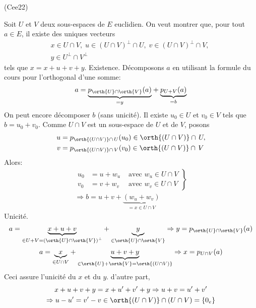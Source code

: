 \begin{tiny}(Cee22)\end{tiny} Soit $U$ et $V$ deux sous-espaces de $E$ euclidien. On veut montrer que, pour tout $a\in E$, il existe des uniques vecteurs
\begin{multline*}
  x\in U\cap V,\; u\in \left( U\cap V\right)^{\perp}\cap U,\; 
v\in \left( U\cap V\right)^{\perp}\cap V,\; \\
y\in U^{\perp}\cap V^{\perp}
\end{multline*}
tels que $x=x+u+v+y$.\newline
Existence. Décomposons $a$ en utilisant la formule du cours pour l'orthogonal d'une somme:
\begin{displaymath}
  a = \underset{=y}{\underbrace{p_{\orth{U}\cap \orth{V}}(a)}} 
  + \underset{=b}{\underbrace{p_{U+V}(a)}}
\end{displaymath}
On peut encore décomposer $b$ (sans unicité). Il existe $u_0\in U$ et $v_0\in V$ tels que $b=u_0 + v_0$.\newline
Comme $U\cap V$ est un sous-espace de $U$ et de $V$, posons
\[
\begin{aligned}
  u &= p_{\orth{\left( U\cap V\right) }\cap\, U}(u_0) \in \orth{\left( U\cap V\right)}\cap\, U, \\
  v &= p_{\orth{\left( U\cap V\right) }\cap\, V}(v_0) \in \orth{\left( U\cap V\right)}\cap\, V
\end{aligned}
\]
Alors:
\begin{multline*}
\left. 
\begin{aligned}
u_0 &= u +w_u &\text{ avec }  w_u\in U\cap V \\ 
v_0 &= v +w_v &\text{ avec }  w_v\in U\cap V 
\end{aligned}
\right\rbrace \\ 
\Rightarrow
b = u +v + \underset{=x\in U\cap V}{\underbrace{(w_u+w_v)}}
\end{multline*}
Unicité.
\begin{displaymath}
  a = \underset{\in U+ V = \left( \orth{U}\cap \orth{V}\right)^{\perp} }{\underbrace{x+ u + v}} + \underset{\in \orth{U}\cap \orth{V}}{\underbrace{y}} 
  \Rightarrow y = p_{\orth{U}\cap \orth{V}}(a)
\end{displaymath}
\begin{displaymath}
  a = \underset{\in U\cap V}{\underbrace{x}} + \underset{\in \orth{U}+ \orth{V}=\orth{(U\cap V)} }{\underbrace{u + v + y}} 
  \Rightarrow x = p_{U\cap V}(a)
\end{displaymath}
Ceci assure l'unicité du $x$ et du $y$. d'autre part,
\begin{multline*}
  x+u+v+y= x+u'+v'+y 
\Rightarrow u+v = u'+v'\\
\Rightarrow u-u' = v'-v \in \orth{\left( U\cap V\right)} \cap \left( U\cap V\right) = \left\lbrace 0_e \right\rbrace  
\end{multline*}
